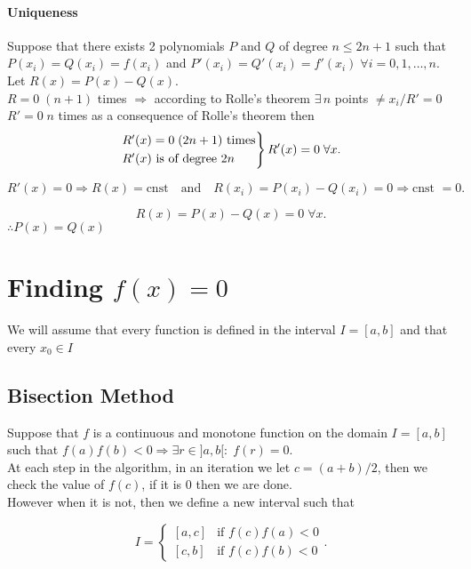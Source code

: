\documentclass{report}
\begin{document}
\subsubsection{Uniqueness}

\begin{myproof}
	Suppose that there exists 2 polynomials $P$ and $Q$ of degree $n\leq 2n+1$ such that $P(x_i)=Q(x_i)=f(x_i)$ and $P'(x_i)=Q'(x_i)=f'(x_i)\;\forall i = 0,1,\dots,n$.\\
	Let $R(x)=P(x)-Q(x)$.\\
	$R=0\;(n+1)$ times $\Rightarrow$ according to Rolle's theorem $\exists\,n$ points $\neq x_i\Big/R'=0$\\
	$R'=0\;n$ times as a consequence of Rolle's theorem then
	\[
		\begin{rcases}
			R'(x)=0\;(2n+1)\text{ times}\\
			R'(x)\text{ is of degree }2n
		\end{rcases}
		R'(x)=0 \;\forall x
		.\]

	\[
		R'(x)=0\Rightarrow R(x)=\text{cnst}\quad\text{and}\quad R(x_i)=P(x_i)-Q(x_i)=0 \Rightarrow \text{cnst } = 0
		.\]

	\[
		R(x) = P(x)-Q(x)=0 \;\forall x
		.\]
	$\therefore P(x) = Q(x)$
\end{myproof}


\chapter{Finding $f(x)=0$}

We will assume that every function is defined in the interval $I = [a,b]$ and that every $x_0\in I$

\section{Bisection Method}

Suppose that $f$ is a continuous and monotone function on the domain $I = [a,b]$ such that $f(a)f(b)<0\Rightarrow \exists r \in]a,b[:\;f(r)=0$.\\

At each step in the algorithm, in an iteration we let $c = (a+b)/2$, then we check the value of $f(c)$, if it is 0 then we are done.\\
However when it is not, then we define a new interval such that

\[
	I = \begin{cases}
		[a,c] & \text{if }f(c)f(a)<0 \\
		[c,b] & \text{if }f(c)f(b)<0
	\end{cases}
	.\]
\end{document}
